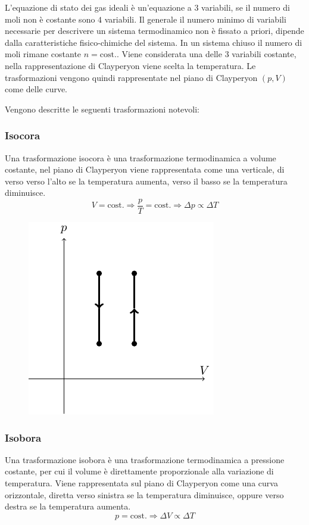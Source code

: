 \documentclass{article}
\numberwithin{equation}{subsection}
\begin{document}
L'equazione di stato dei gas ideali è un'equazione a $3$ 
variabili, se il numero di moli non è costante sono $4$ 
variabili. Il generale il numero minimo di variabili necessarie per descrivere un sistema termodinamico non è fissato a priori, dipende dalla caratteristiche 
fisico-chimiche del sistema. In un sistema chiuso il numero di moli 
rimane costante $n=\mathrm{cost.}$. Viene considerata una delle $3$ variabili 
costante, nella rappresentazione di Clayperyon viene scelta 
la temperatura. Le trasformazioni vengono quindi rappresentate 
nel piano di Clayperyon $(p,V)$ come delle curve.  



Vengono descritte le seguenti trasformazioni notevoli:

\subsubsection{Isocora}
Una trasformazione isocora è una trasformazione termodinamica 
a volume costante, nel piano di Clayperyon viene rappresentata 
come una verticale, di verso verso l'alto se la temperatura 
aumenta, verso il basso se la temperatura diminuisce. 
\begin{equation*}
    V=\mathrm{cost.}\Rightarrow
    \displaystyle\frac{p}{T}=\mathrm{cost.}\Rightarrow
    \Delta p \propto\Delta T
\end{equation*}

\begin{figure}[H]%
    \centering
    \includegraphics{isocora.pdf}%
\end{figure}

\subsubsection{Isobora}
Una trasformazione isobora è una trasformazione 
termodinamica a pressione costante, per cui il 
volume è direttamente proporzionale alla variazione di 
temperatura. Viene rappresentata sul piano di Clayperyon come 
una curva orizzontale, diretta verso sinistra se la 
temperatura diminuisce, oppure verso destra se la temperatura 
aumenta. 
\begin{equation*}
    p=\mathrm{cost.}\Rightarrow \Delta V\propto\Delta T
\end{equation*}
\end{document}
